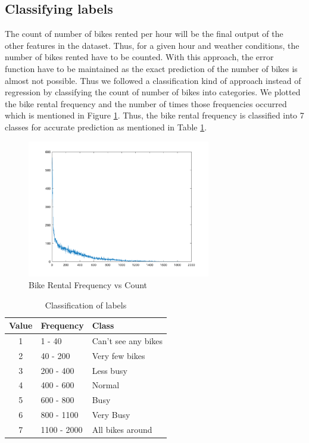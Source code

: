 \documentclass[journal, a4paper]{IEEEtran}
\begin{document}
\subsection{Classifying labels}
The count of number of bikes rented per hour will be the final output of the other features in the dataset. Thus, for a given hour and weather conditions, the number of bikes rented have to be counted. With this approach, the error function have to be maintained as the exact prediction of the number of bikes is almost not possible. Thus we followed a classification kind of approach instead of regression by classifying the count of number of bikes into categories. We plotted the bike rental frequency and the number of times those frequencies occurred which is mentioned in Figure \ref{countvsdays}. Thus, the bike rental frequency is classified into 7 classes for accurate prediction as mentioned in Table \ref{frequencyclasses}.
\begin{figure}[ht!]
\centering
\includegraphics[width=80mm]{images/Count_vs_Days.png}
\caption{Bike Rental Frequency vs Count}
\label{countvsdays}
\end{figure}
\begin{center}
\begin{table}[ht!]
\centering
 \begin{tabular}{||c l l||} 
 \hline
 Value & Frequency & Class \\ [0.5ex] 
 \hline\hline
 1 & 1 - 40 & Can't see any bikes \\ 
 \hline
 2 & 40 - 200 & Very few bikes \\
 \hline
 3 & 200 - 400 & Less busy \\
 \hline
 4 & 400 - 600 & Normal \\
 \hline
 5 & 600 - 800 & Busy \\
 \hline
 6 & 800 - 1100 & Very Busy \\
 \hline
 7 & 1100 - 2000 & All bikes around \\ [1ex] 
 \hline
\end{tabular}
\caption{Classification of labels}
 \label{frequencyclasses}
\end{table}
\end{center}
\end{document}

